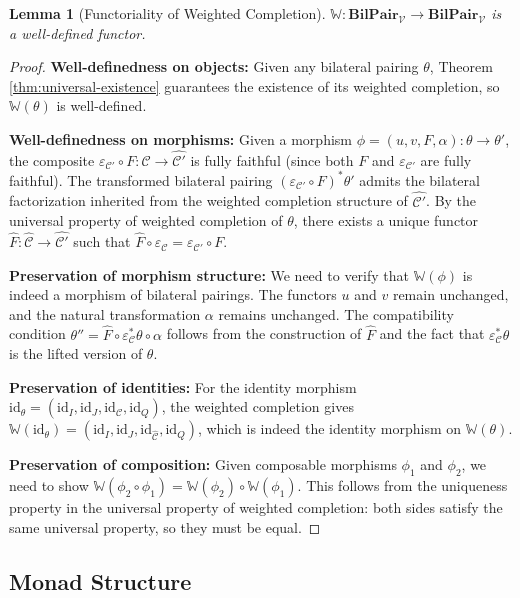 \documentclass[11pt]{article}
\theoremstyle{plain}
\newtheorem{lemma}[theorem]{Lemma}
\theoremstyle{definition}
\theoremstyle{remark}
\newcommand{\V}{\mathcal{V}}
\newcommand{\C}{\mathcal{C}}
\newcommand{\id}{\mathrm{id}}
\newcommand{\wh}[1]{\widehat{#1}}
\begin{document}
\begin{lemma}[Functoriality of Weighted Completion]\label{lem:completion-functorial}
$\mathbb{W} : \mathbf{BilPair}_\V \to \mathbf{BilPair}_\V$ is a well-defined functor.
\end{lemma}

\begin{proof}
\textbf{Well-definedness on objects:} Given any bilateral pairing $\theta$, Theorem \ref{thm:universal-existence} guarantees the existence of its weighted completion, so $\mathbb{W}(\theta)$ is well-defined.

\textbf{Well-definedness on morphisms:} Given a morphism $\phi = (u, v, F, \alpha) : \theta \to \theta'$, the composite $\varepsilon_{\C'} \circ F : \C \to \wh{\C'}$ is fully faithful (since both $F$ and $\varepsilon_{\C'}$ are fully faithful). The transformed bilateral pairing $(\varepsilon_{\C'} \circ F)^* \theta'$ admits the bilateral factorization inherited from the weighted completion structure of $\wh{\C'}$. By the universal property of weighted completion of $\theta$, there exists a unique functor $\wh{F} : \wh{\C} \to \wh{\C'}$ such that $\wh{F} \circ \varepsilon_\C = \varepsilon_{\C'} \circ F$.

\textbf{Preservation of morphism structure:} We need to verify that $\mathbb{W}(\phi)$ is indeed a morphism of bilateral pairings. The functors $u$ and $v$ remain unchanged, and the natural transformation $\alpha$ remains unchanged. The compatibility condition $\theta'' = \wh{F} \circ \varepsilon_\C^* \theta \circ \alpha$ follows from the construction of $\wh{F}$ and the fact that $\varepsilon_\C^* \theta$ is the lifted version of $\theta$.

\textbf{Preservation of identities:} For the identity morphism $\id_\theta = (\id_I, \id_J, \id_\C, \id_Q)$, the weighted completion gives $\mathbb{W}(\id_\theta) = (\id_I, \id_J, \id_{\wh{\C}}, \id_Q)$, which is indeed the identity morphism on $\mathbb{W}(\theta)$.

\textbf{Preservation of composition:} Given composable morphisms $\phi_1$ and $\phi_2$, we need to show $\mathbb{W}(\phi_2 \circ \phi_1) = \mathbb{W}(\phi_2) \circ \mathbb{W}(\phi_1)$. This follows from the uniqueness property in the universal property of weighted completion: both sides satisfy the same universal property, so they must be equal.
\end{proof}

\subsection{Monad Structure}
\end{document}

